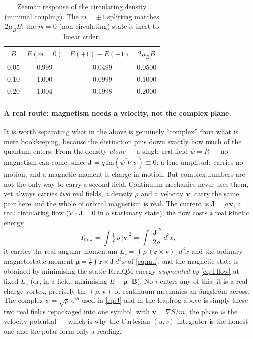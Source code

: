 \documentclass[11pt]{article}
\begin{document}
\begin{table}[h]
\centering\small
\begin{tabular}{cccc}
\toprule
$B$ & $E(m{=}0)$ & $E(+1)-E(-1)$ & $2\mu_B B$ \\
\midrule
$0.05$ & $0.999$ & $+0.0499$ & $0.0500$ \\
$0.10$ & $1.000$ & $+0.0999$ & $0.1000$ \\
$0.20$ & $1.004$ & $+0.1998$ & $0.2000$ \\
\bottomrule
\end{tabular}
\caption{Zeeman response of the circulating density (minimal coupling). The $m=\pm1$ splitting matches
$2\mu_B B$; the $m=0$ (non-circulating) state is inert to linear order.}
\label{tab:zeeman}
\end{table}

\paragraph{A real route: magnetism needs a velocity, not the complex plane.} It is worth separating what in
the above is genuinely ``complex'' from what is mere bookkeeping, because the distinction pins down exactly how
much of the quantum enters. From the density \emph{alone} --- a single real field $\psi=R$ --- no magnetism can
come, since $\mathbf J=q\,\mathrm{Im}(\psi^*\nabla\psi)\equiv0$: a lone amplitude carries no motion, and a
magnetic moment is charge in motion. But complex numbers are not the only way to carry a second field. Continuum
mechanics never uses them, yet always carries \emph{two} real fields, a density $\rho$ and a velocity
$\mathbf v$; carry the same pair here and the whole of orbital magnetism is real. The current is
$\mathbf J=\rho\,\mathbf v$, a real circulating flow ($\nabla\!\cdot\!\mathbf J=0$ in a stationary state); the
flow costs a real kinetic energy
\begin{equation}
T_{\text{flow}}=\int\tfrac12\,\rho\,|\mathbf v|^2=\int\frac{|\mathbf J|^2}{2\rho}\,d^3x ,
\label{eq:Tflow}
\end{equation}
it carries the real angular momentum $L_z=\int\rho\,(\mathbf r\times\mathbf v)_z\,d^3x$ and the ordinary
magnetostatic moment $\boldsymbol\mu=\tfrac12\int\mathbf r\times\mathbf J\,d^3x$ of \eqref{eq:mu}, and the
magnetic state is obtained by minimising the static RealQM energy \emph{augmented by} \eqref{eq:Tflow} at fixed
$L_z$ (or, in a field, minimising $E-\boldsymbol\mu\!\cdot\!\mathbf B$). No $i$ enters any of this: it is a real
charge vortex, precisely the $(\rho,\mathbf v)$ of continuum mechanics an \aa ngstr\"om across. The complex
$\psi=\sqrt\rho\,e^{iS}$ used in \eqref{eq:J} and in the leapfrog above is simply these two real fields
repackaged into one symbol, with $\mathbf v=\nabla S/m$; the phase \emph{is} the velocity potential --- which
is why the Cartesian $(u,v)$ integrator is the honest one and the polar form only a reading.
\end{document}
